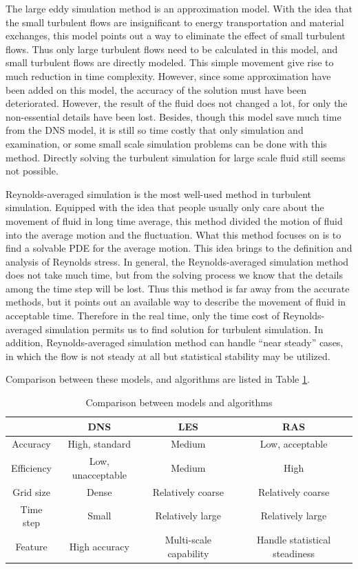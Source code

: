 \documentclass[english, nochinese]{pkupaper}
\begin{document}
The large eddy simulation method is an approximation model. With the idea that the small turbulent flows are insignificant to energy transportation and material exchanges, this model points out a way to eliminate the effect of small turbulent flows. Thus only large turbulent flows need to be calculated in this model, and small turbulent flows are directly modeled. This simple movement give rise to much reduction in time complexity. However, since some approximation have been added on this model, the accuracy of the solution must have been deteriorated. However, the result of the fluid does not changed a lot, for only the non-essential details have been lost. Besides, though this model save much time from the DNS model, it is still so time costly that only simulation and examination, or some small scale simulation problems can be done with this method. Directly solving the turbulent simulation for large scale fluid still seems not possible.

Reynolds-averaged simulation is the most well-used method in turbulent simulation. Equipped with the idea that people usually only care about the movement of fluid in long time average, this method divided the motion of fluid into the average motion and the fluctuation. What this method focuses on is to find a solvable PDE for the average motion. This idea brings to the definition and analysis of Reynolds stress. In general, the Reynolds-averaged simulation method does not take much time, but from the solving process we know that the details among the time step will be lost. Thus this method is far away from the accurate methods, but it points out an available way to describe the movement of fluid in acceptable time. Therefore in the real time, only the time cost of Reynolds-averaged simulation permits us to find solution for turbulent simulation. In addition, Reynolds-averaged simulation method can handle ``near steady'' cases, in which the flow is not steady at all but statistical stability may be utilized.

Comparison between these models, and algorithms are listed in Table \ref{Tbl:Comp}.

\begin{table}
\centering
\caption{Comparison between models and algorithms}
\label{Tbl:Comp}
\begin{tabular}{|c|c|c|c|}
\hline
& DNS & LES & RAS \\
\hline
Accuracy & High, standard & Medium & Low, acceptable \\
\hline
Efficiency & Low, unacceptable & Medium & High \\
\hline
Grid size & Dense & Relatively coarse & Relatively coarse \\
\hline
Time step & Small & Relatively large & Relatively large \\
\hline
Feature & High accuracy & Multi-scale capability & Handle statistical steadiness \\
\hline
\end{tabular}
\end{table}
\end{document}
